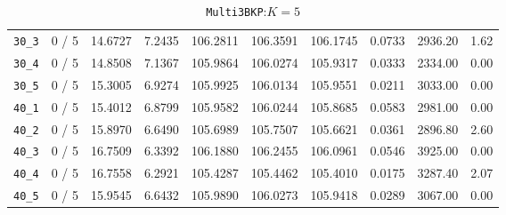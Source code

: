 \begin{table}[h!]
\begin{center}
\begin{tabular}{| c | c | c | c | c | c | c | c | c | c |}
\verb|30_3| & 0 / 5 & 14.6727 & 7.2435 & 106.2811 & 106.3591 & 106.1745 & 0.0733 & 2936.20 & 1.62\\ 
\verb|30_4| & 0 / 5 & 14.8508 & 7.1367 & 105.9864 & 106.0274 & 105.9317 & 0.0333 & 2334.00 & 0.00\\ 
\verb|30_5| & 0 / 5 & 15.3005 & 6.9274 & 105.9925 & 106.0134 & 105.9551 & 0.0211 & 3033.00 & 0.00\\ 
\verb|40_1| & 0 / 5 & 15.4012 & 6.8799 & 105.9582 & 106.0244 & 105.8685 & 0.0583 & 2981.00 & 0.00\\ 
\verb|40_2| & 0 / 5 & 15.8970 & 6.6490 & 105.6989 & 105.7507 & 105.6621 & 0.0361 & 2896.80 & 2.60\\ 
\verb|40_3| & 0 / 5 & 16.7509 & 6.3392 & 106.1880 & 106.2455 & 106.0961 & 0.0546 & 3925.00 & 0.00\\ 
\verb|40_4| & 0 / 5 & 16.7558 & 6.2921 & 105.4287 & 105.4462 & 105.4010 & 0.0175 & 3287.40 & 2.07\\ 
\verb|40_5| & 0 / 5 & 15.9545 & 6.6432 & 105.9890 & 106.0273 & 105.9418 & 0.0289 & 3067.00 & 0.00\\ 
\hline
\end{tabular}
\caption{\texttt{Multi3BKP}:$K=5$}
\label{table:multi:5}
\end{center}
\end{table}


